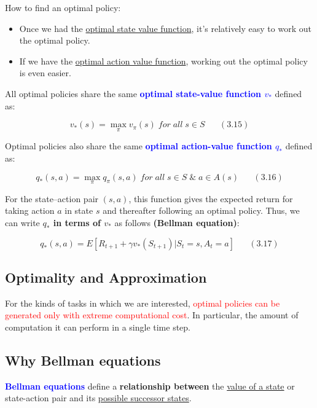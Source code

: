 \documentclass[12pt, a4paper]{article}
\begin{document}
How to find an optimal policy:
\begin{itemize}
  \item Once we had the \uline{optimal state value function}, it's relatively easy to work out the optimal policy.
  \item If we have the \uline{optimal action value function}, working out the optimal policy is even easier.
\end{itemize}

All optimal policies share the same \textcolor{blue}{\textbf{optimal state-value function
\(v_*\)}} defined as:

\[v_*(s) = \max_\pi v_\pi(s) \;for\;all\; s \in S \;\;\;\;\;\;(3.15)\]

Optimal policies also share the same \textcolor{blue}{\textbf{optimal action-value function \(q_*\)}} defined as:

\[q_*(s, a) = \max_\pi q_\pi(s, a) \;for\;all\; s \in S \; \& \; a \in A(s) \;\;\;\;\;\;(3.16)\]

For the state--action pair \((s, a)\), this function gives the expected
return for taking action \(a\) in state \(s\) and thereafter following
an optimal policy. Thus, we can write \textbf{\(q_*\) in terms of
\(v_*\)} as follows \textbf{(Bellman equation)}:

\[q_*(s, a) = E[R_{t+1} + \gamma v_*(S_{t+1}) | S_t = s, A_t = a] \;\;\;\;\;\;(3.17)\]






\subsection{Optimality and Approximation }\label{optimality-and-approximation}

For the kinds of tasks in which we are interested, \textcolor{red}{optimal policies can be generated only with extreme computational cost}. In particular, the amount of computation it can perform in a single time step.







\subsection{Why Bellman equations}\label{why-bellman-equations}

\textcolor{blue}{\textbf{Bellman equations}} define a \textbf{relationship between} the \uline{value of a state} or state-action pair and its \uline{possible successor states}.
\end{document}
